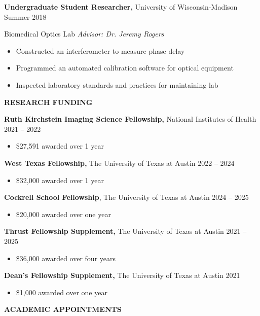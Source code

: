\documentclass[
]{article}
\begin{document}
\textbf{Undergraduate Student Researcher,} University of Wisconsin-Madison Summer 2018

Biomedical Optics Lab \textbar{} \emph{Advisor: Dr. Jeremy Rogers}

\begin{itemize}
\item
  Constructed an interferometer to measure phase delay
\item
  Programmed an automated calibration software for optical equipment
\item
  Inspected laboratory standards and practices for maintaining lab
\end{itemize}

\textbf{RESEARCH FUNDING}

\textbf{Ruth Kirchstein Imaging Science Fellowship,} National Institutes of Health 2021 -- 2022

\begin{itemize}
\item
  \$27,591 awarded over 1 year
\end{itemize}

\textbf{West Texas Fellowship,} The University of Texas at Austin 2022 -- 2024

\begin{itemize}
\item
  \$32,000 awarded over 1 year
\end{itemize}

\textbf{Cockrell School Fellowship}, The University of Texas at Austin 2024 -- 2025

\begin{itemize}
\item
  \$20,000 awarded over one year
\end{itemize}

\textbf{Thrust Fellowship Supplement,} The University of Texas at Austin 2021 -- 2025

\begin{itemize}
\item
  \$36,000 awarded over four years
\end{itemize}

\textbf{Dean's Fellowship Supplement,} The University of Texas at Austin 2021

\begin{itemize}
\item
  \$1,000 awarded over one year
\end{itemize}

\textbf{ACADEMIC APPOINTMENTS}
\end{document}
